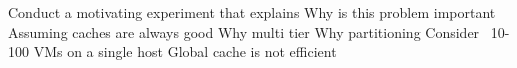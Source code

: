 Conduct a motivating experiment that explains
    Why is this problem important
    Assuming caches are always good
        Why multi tier
        Why partitioning
            Consider ~10-100 VMs on a single host
            Global cache is not efficient
